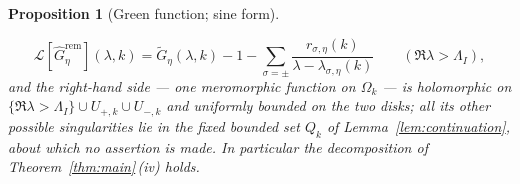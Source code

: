 \documentclass[11pt,a4paper]{amsart}
\newtheorem{proposition}[theorem]{Proposition}
\theoremstyle{definition}
\theoremstyle{remark}
\begin{document}
\begin{proposition}[Green function; sine form]
\begin{itemize}
\begin{equation}\label{eq:remtransform}
\mathcal L[\widehat G^{\mathrm{rem}}_\eta](\lambda,k)
=\widetilde G_\eta(\lambda,k)-1-\sum_{\sigma=\pm}\frac{r_{\sigma,\eta}(k)}{\lambda-\lambda_{\sigma,\eta}(k)}
\qquad(\Re\lambda>\Lambda_I),
\end{equation}
and the right-hand side --- one meromorphic function on $\Omega_k$ --- is holomorphic on $\{\Re\lambda>\Lambda_I\}\cup U_{+,k}\cup U_{-,k}$ and uniformly bounded on the two disks; all its other possible singularities lie in the fixed bounded set $Q_k$ of Lemma~\ref{lem:continuation}, about which no assertion is made. In particular the decomposition of Theorem~\textup{\ref{thm:main}\,(iv)} holds.
\end{itemize}
\end{proposition}
\end{document}

